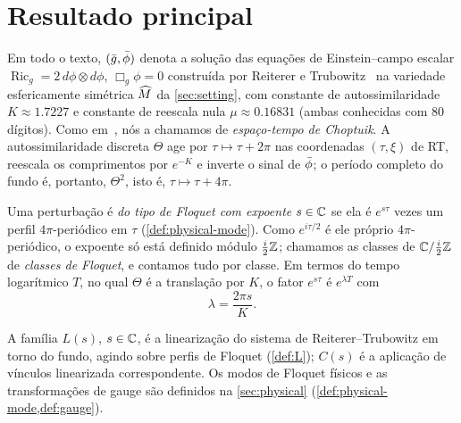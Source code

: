 \section{Resultado principal}\label{sec:main}

Em todo o texto, $(\bar g,\bar\phi)$ denota a solução das equações de Einstein--campo escalar
$\operatorname{Ric}_{g}=2\,d\phi\otimes d\phi$, $\Box_{g}\phi=0$ construída por Reiterer e
Trubowitz~\cite{RT2019} na variedade esfericamente simétrica $\widehat M$ da \cref{sec:setting}, com
constante de autossimilaridade $K\approx 1.7227$ e constante de reescala nula $\mu\approx 0.16831$ (ambas conhecidas
com $80$ dígitos). Como em~\cite{RT2019}, nós a chamamos de \emph{espaço-tempo de Choptuik}. A autossimilaridade
discreta $\Theta$ age por $\tau\mapsto\tau+2\pi$ nas coordenadas $(\tau,\xi)$ de RT, reescala os comprimentos por
$e^{-K}$ e inverte o sinal de $\bar\phi$; o período completo do fundo é, portanto, $\Theta^{2}$, isto é,
$\tau\mapsto\tau+4\pi$.

Uma perturbação é \emph{do tipo de Floquet com expoente $s\in\mathbb{C}$} se ela é $e^{s\tau}$ vezes um perfil
$4\pi$-periódico em $\tau$ (\cref{def:physical-mode}). Como $e^{i\tau/2}$ é ele próprio $4\pi$-periódico, o
expoente só está definido módulo $\tfrac{i}{2}\mathbb{Z}$; chamamos as classes de $\mathbb{C}/\tfrac{i}{2}\mathbb{Z}$ de \emph{classes de
Floquet}, e contamos tudo por classe. Em termos do tempo logarítmico $T$, no qual $\Theta$ é a
translação por $K$, o fator $e^{s\tau}$ é $e^{\lambda T}$ com
\begin{equation}\label{eq:lambda}
  \lambda=\frac{2\pi s}{K}.
\end{equation}

A família $L(s)$, $s\in\mathbb{C}$, é a linearização do sistema de Reiterer--Trubowitz em torno do fundo,
agindo sobre perfis de Floquet (\cref{def:L}); $C(s)$ é a aplicação de vínculos linearizada correspondente. Os
modos de Floquet físicos e as transformações de gauge são definidos na \cref{sec:physical}
(\cref{def:physical-mode,def:gauge}).

